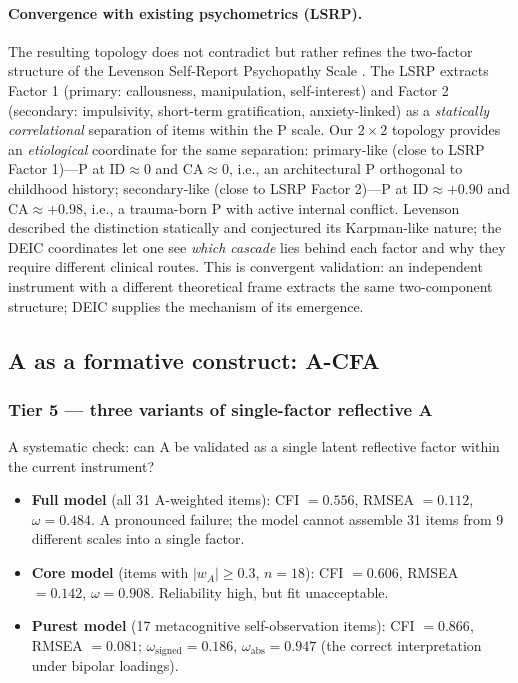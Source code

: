 \paragraph{Convergence with existing psychometrics (LSRP).} The resulting topology does not contradict but rather refines the two-factor structure of the Levenson Self-Report Psychopathy Scale \citep{levenson1995}. The LSRP extracts Factor 1 (primary: callousness, manipulation, self-interest) and Factor 2 (secondary: impulsivity, short-term gratification, anxiety-linked) as a \emph{statically correlational} separation of items within the P scale. Our $2 \times 2$ topology provides an \emph{etiological} coordinate for the same separation: primary-like (close to LSRP Factor 1)---P at $\text{ID} \approx 0$ and $\text{CA} \approx 0$, i.e., an architectural P orthogonal to childhood history; secondary-like (close to LSRP Factor 2)---P at $\text{ID} \approx +0.90$ and $\text{CA} \approx +0.98$, i.e., a trauma-born P with active internal conflict. Levenson described the distinction statically and conjectured its Karpman-like nature; the DEIC coordinates let one see \emph{which cascade} lies behind each factor and why they require different clinical routes. This is convergent validation: an independent instrument with a different theoretical frame extracts the same two-component structure; DEIC supplies the mechanism of its emergence.

\subsection{A as a formative construct: A-CFA}
\label{subsec:a_cfa}

\subsubsection{Tier 5 --- three variants of single-factor reflective A}

A systematic check: can A be validated as a single latent reflective factor within the current instrument?

\begin{itemize}
    \item \textbf{Full model} (all 31 A-weighted items): CFI $= 0.556$, RMSEA $= 0.112$, $\omega = 0.484$. A pronounced failure; the model cannot assemble 31 items from 9 different scales into a single factor.
    \item \textbf{Core model} (items with $|w_A| \geq 0.3$, $n = 18$): CFI $= 0.606$, RMSEA $= 0.142$, $\omega = 0.908$. Reliability high, but fit unacceptable.
    \item \textbf{Purest model} (17 metacognitive self-observation items): CFI $= 0.866$, RMSEA $= 0.081$; $\omega_{\text{signed}} = 0.186$, $\omega_{\text{abs}} = 0.947$ (the correct interpretation under bipolar loadings).
\end{itemize}

